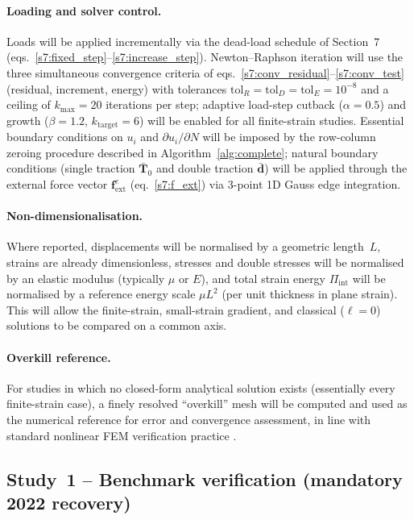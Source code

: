 \documentclass[11pt]{article}
\begin{document}
\paragraph{Loading and solver control.}
Loads will be applied incrementally via the dead-load schedule of
Section~7 (eqs.~\eqref{s7:fixed_step}--\eqref{s7:increase_step}).
Newton--Raphson iteration will use the three simultaneous
convergence criteria of eqs.~\eqref{s7:conv_residual}--\eqref{s7:conv_test}
(residual, increment, energy) with tolerances
$\mathrm{tol}_{R}=\mathrm{tol}_{D}=\mathrm{tol}_{E}=10^{-8}$ and
a ceiling of $k_{\max}=20$ iterations per step; adaptive
load-step cutback ($\alpha=0.5$) and growth ($\beta=1.2$,
$k_{\mathrm{target}}=6$) will be enabled for all finite-strain
studies.  Essential boundary conditions on $u_i$ and
$\partial u_i/\partial N$ will be imposed by the row-column
zeroing procedure described in Algorithm~\ref{alg:complete};
natural boundary conditions (single traction $\bar{\mathbf{T}}_{0}$
and double traction $\bar{\mathbf{d}}$) will be applied through
the external force vector $\mathbf{f}_{\mathrm{ext}}^{e}$
(eq.~\eqref{s7:f_ext}) via 3-point 1D Gauss edge integration.

\paragraph{Non-dimensionalisation.}
Where reported, displacements will be normalised by a geometric
length~$L$, strains are already dimensionless, stresses and
double stresses will be normalised by an elastic modulus
(typically $\mu$ or $E$), and total strain energy $\Pi_{\mathrm{int}}$
will be normalised by a reference energy scale $\mu L^{2}$
(per unit thickness in plane strain).  This will allow the
finite-strain, small-strain gradient, and classical
($\ell=0$) solutions to be compared on a common axis.

\paragraph{Overkill reference.}
For studies in which no closed-form analytical solution exists
(essentially every finite-strain case), a finely resolved
``overkill'' mesh will be computed and used as the numerical
reference for error and convergence assessment, in line with
standard nonlinear FEM verification practice
\cite{Bathe2006,ZienkiewiczTaylor2000}.

\subsection{Study~1 -- Benchmark verification (mandatory 2022 recovery)}
\label{ssec:s9_study1}
\end{document}
